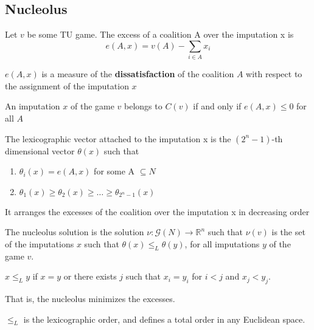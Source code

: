 \documentclass[../main.tex]{subfiles}
\begin{document}
\subsection{Nucleolus}
\vspace{0.25cm}
\begin{definition}[Excess]
    Let $v$ be some \gls{TU} game. The excess of a coalition A over the imputation x is
    \[
        e(A,x) = v(A) - \sum_{i \in A} x_i
    \]
\end{definition}
$e(A,x)$ is a measure of the \textbf{dissatisfaction} of the coalition $A$ with respect to the assignment of the imputation $x$
\begin{remark}
    An imputation $x$ of the game $v$ belongs to $C(v)$ if and only if $e(A,x) \leq 0$ for all $A$
\end{remark}
\begin{definition}
    The lexicographic vector attached to the imputation x is the $(2^n - 1)$-th dimensional vector $\theta(x)$ such that
    \begin{enumerate}
        \item $\theta_i(x) = e(A,x)$ for some A $\subseteq N$
        \item $\theta_1(x) \geq \theta_2(x) \geq \ldots \geq \theta_{2^n - 1}(x)$
    \end{enumerate}
    It arranges the excesses of the coalition over the imputation x in decreasing order
\end{definition}
\begin{definition}[Nucleolus]
    The nucleolus solution is the solution $\nu : \mathcal{G}(N) \to \mathbb{R}^n$ such that $\nu(v)$ is the set of the imputations $x$ such that $\theta(x) \leq_L \theta(y)$, for all imputations $y$ of the game $v$.
\end{definition}
\begin{remark}
    $x \leq_L y$ if $x=y$ or there exists $j$ such that $x_i = y_i$ for $i < j$ and $x_j < y_j$.

    \begin{note}
        That is, the nucleolus minimizes the excesses.
    \end{note}

    $\leq_L$ is the lexicographic order, and defines a total order in any Euclidean space.
\end{remark}
\end{document}
